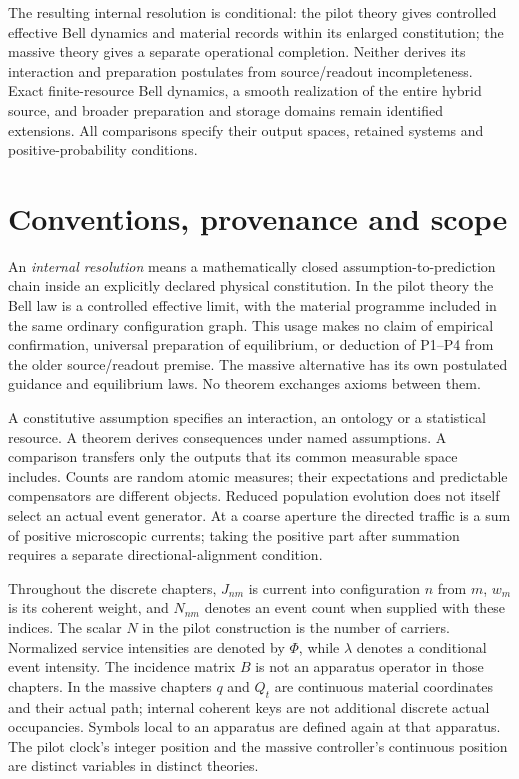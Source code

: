 \documentclass[11pt,oneside,openany]{book}
\theoremstyle{definition}
\theoremstyle{remark}\newtheorem{remark}[theorem]{Remark}
\begin{document}
The resulting internal resolution is conditional: the pilot theory gives
controlled effective Bell dynamics and material records within its
enlarged constitution; the massive theory gives a separate operational
completion. Neither derives its interaction and preparation postulates
from source/readout incompleteness. Exact finite-resource Bell dynamics,
a smooth realization of the entire hybrid source, and broader preparation
and storage domains remain identified extensions. All comparisons specify
their output spaces, retained systems and positive-probability conditions.

\chapter*{Conventions, provenance and scope}
An \emph{internal resolution} means a mathematically closed
assumption-to-prediction chain inside an explicitly declared physical
constitution. In the pilot theory the Bell law is a controlled effective
limit, with the material programme included in the same ordinary
configuration graph. This usage makes no claim of empirical confirmation,
universal preparation of equilibrium, or deduction of P1--P4 from the older
source/readout premise. The massive alternative has its own postulated
guidance and equilibrium laws. No theorem exchanges axioms between them.

A constitutive assumption specifies an interaction, an ontology or a
statistical resource. A theorem derives consequences under named
assumptions. A comparison transfers only the outputs that its common
measurable space includes. Counts are random atomic measures; their
expectations and predictable compensators are different objects. Reduced
population evolution does not itself select an actual event generator.
At a coarse aperture the directed traffic is a sum of positive microscopic
currents; taking the positive part after summation requires a separate
directional-alignment condition.

Throughout the discrete chapters, $J_{nm}$ is current into configuration
$n$ from $m$, $w_m$ is its coherent weight, and $N_{nm}$ denotes an event
count when supplied with these indices. The scalar $N$ in the pilot
construction is the number of carriers. Normalized service intensities
are denoted by $\Phi$, while $\lambda$ denotes a conditional event
intensity. The incidence matrix $B$ is not an apparatus operator in those
chapters. In the massive chapters $q$ and $Q_t$ are continuous material
coordinates and their actual path; internal coherent keys are not
additional discrete actual occupancies. Symbols local to an apparatus are
defined again at that apparatus. The pilot clock's integer position and
the massive controller's continuous position are distinct variables in
distinct theories.
\end{document}
